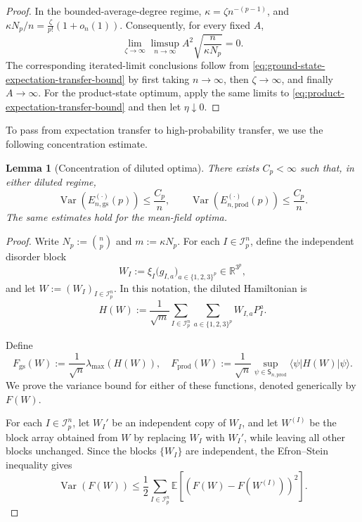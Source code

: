 \documentclass[12pt]{article}
\newtheorem{lemma}[theorem]{Lemma}
\newcommand{\E}{\mathbb{E}}
\newcommand{\R}{\mathbb{R}}
\newcommand{\mcI}{\mathcal{I}}
\begin{document}
\begin{appendix}
\begin{proof}
In the bounded-average-degree regime,
\(\kappa=\zeta n^{-(p-1)}\), and $\kappa N_p/n
    =
    \frac{\zeta}{p!}(1+o_n(1))$. Consequently, for every fixed \(A\),
\[
    \lim_{\zeta\to\infty}
    \limsup_{n\to\infty}
    A^2\sqrt{\frac{n}{\kappa N_p}}
    =0.
\]
The corresponding iterated-limit conclusions follow from
\eqref{eq:ground-state-expectation-transfer-bound} by first taking
\(n\to\infty\), then \(\zeta\to\infty\), and finally \(A\to\infty\).
For the product-state optimum, apply the same limits to
\eqref{eq:product-expectation-transfer-bound} and then let
\(\eta\downarrow0\).
\end{proof}



To pass from expectation transfer to high-probability transfer, we use
the following concentration estimate.

\begin{lemma}[Concentration of diluted optima]
\label{lem:diluted-optima-concentration}
There exists \(C_p<\infty\) such that, in either diluted regime,
\[
    \operatorname{Var}\left(
        E_{n,\mathrm{gs}}^{(\cdot)}(p)
    \right)
    \le
    \frac{C_p}{n},
    \qquad
    \operatorname{Var}\left(
        E_{n,\mathrm{prod}}^{(\cdot)}(p)
    \right)
    \le
    \frac{C_p}{n}.
\]
The same estimates hold for the mean-field optima.
\end{lemma}

\begin{proof}
Write \(N_p:=\binom np\) and \(m:=\kappa N_p\). For each
\(I\in\mcI_p^n\), define the independent disorder block
\[
    W_I
    :=
    \xi_I
    \bigl(g_{I,a}\bigr)_{a\in\{1,2,3\}^p}
    \in\R^{3^p},
\]
and let \(W:=(W_I)_{I\in\mcI_p^n}\). In this notation, the diluted
Hamiltonian is
\[
    H(W)
    :=
    \frac1{\sqrt m}
    \sum_{I\in\mcI_p^n}
    \sum_{a\in\{1,2,3\}^p}
    W_{I,a}P_I^a.
\]

Define
\[
    F_{\mathrm{gs}}(W)
    :=
    \frac1{\sqrt n}\lambda_{\max}(H(W)),
    \quad
    F_{\mathrm{prod}}(W)
    :=
    \frac1{\sqrt n}
    \sup_{\psi\in\mathsf S_{n,\mathrm{prod}}}
    \langle\psi|H(W)|\psi\rangle.
\]
We prove the variance bound for either of these functions, denoted
generically by \(F(W)\).

For each \(I\in\mcI_p^n\), let \(W_I'\) be an independent copy of
\(W_I\), and let \(W^{(I)}\) be the block array obtained from \(W\) by
replacing \(W_I\) with \(W_I'\), while leaving all other blocks unchanged.
Since the blocks \(\{W_I\}\) are independent, the Efron--Stein inequality
gives
\[
    \operatorname{Var}(F(W))
    \le
    \frac12
    \sum_{I\in\mcI_p^n}
    \E[
        (F(W)-F(W^{(I)}))^2
    ].
\]


\end{proof}
\end{appendix}
\end{document}
